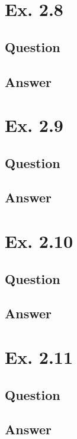 \documentclass[12pt]{article}
\begin{document}
\newpage
\section*{Ex. 2.8}
\subsection*{Question}

\subsection*{Answer}

\newpage
\section*{Ex. 2.9}
\subsection*{Question}

\subsection*{Answer}

\newpage
\section*{Ex. 2.10}
\subsection*{Question}

\subsection*{Answer}

\newpage
\section*{Ex. 2.11}
\subsection*{Question}

\subsection*{Answer}
\end{document}
